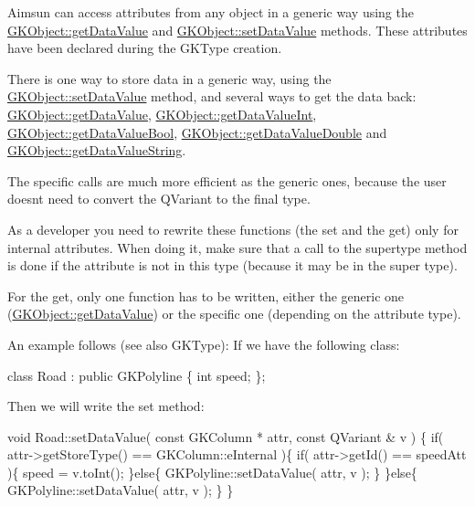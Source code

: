 Aimsun can access attributes from any object in a generic way using the \hyperlink{classGKObject_ac75262d879bc8dc912234fe64a618726}{G\+K\+Object\+::get\+Data\+Value} and \hyperlink{classGKObject_afc228a2c74e04adfbe58190698ce60d6}{G\+K\+Object\+::set\+Data\+Value} methods. These attributes have been declared during the G\+K\+Type creation.

There is one way to store data in a generic way, using the \hyperlink{classGKObject_afc228a2c74e04adfbe58190698ce60d6}{G\+K\+Object\+::set\+Data\+Value} method, and several ways to get the data back\+: \hyperlink{classGKObject_ac75262d879bc8dc912234fe64a618726}{G\+K\+Object\+::get\+Data\+Value}, \hyperlink{classGKObject_a1a19168a7f85db37554ae5632a5e89a5}{G\+K\+Object\+::get\+Data\+Value\+Int}, \hyperlink{classGKObject_a7f84545d868c53f65e6df09a8ca10f75}{G\+K\+Object\+::get\+Data\+Value\+Bool}, \hyperlink{classGKObject_a5f2d6ea14b11d42dee9d7e795dcb9370}{G\+K\+Object\+::get\+Data\+Value\+Double} and \hyperlink{classGKObject_ab7ea66283fe3a7732da043262dff51e2}{G\+K\+Object\+::get\+Data\+Value\+String}.

The specific calls are much more efficient as the generic ones, because the user doesn\textquotesingle{}t need to convert the Q\+Variant to the final type.

As a developer you need to rewrite these functions (the set and the get) only for internal attributes. When doing it, make sure that a call to the supertype method is done if the attribute is not in this type (because it may be in the super type).

For the get, only one function has to be written, either the generic one (\hyperlink{classGKObject_ac75262d879bc8dc912234fe64a618726}{G\+K\+Object\+::get\+Data\+Value}) or the specific one (depending on the attribute type).

An example follows (see also G\+K\+Type)\+: If we have the following class\+: 
\begin{DoxyCode}
\textcolor{keyword}{class }Road : \textcolor{keyword}{public} GKPolyline
\{
    \textcolor{keywordtype}{int} speed;
\};
\end{DoxyCode}


Then we will write the set method\+: 
\begin{DoxyCode}
\textcolor{keywordtype}{void} Road::setDataValue( \textcolor{keyword}{const} GKColumn * attr, \textcolor{keyword}{const} QVariant & v )
\{
    \textcolor{keywordflow}{if}( attr->getStoreType() == GKColumn::eInternal )\{
        \textcolor{keywordflow}{if}( attr->getId() == speedAtt )\{
            speed = v.toInt();
        \}\textcolor{keywordflow}{else}\{
            GKPolyline::setDataValue( attr, v );        
        \}
    \}\textcolor{keywordflow}{else}\{
        GKPolyline::setDataValue( attr, v );
    \}
\}
\end{DoxyCode}


